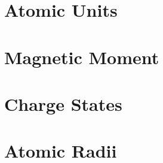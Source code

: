 








\section{Atomic Units}


\section{Magnetic Moment}

\section{Charge States}

\section{Atomic Radii}



